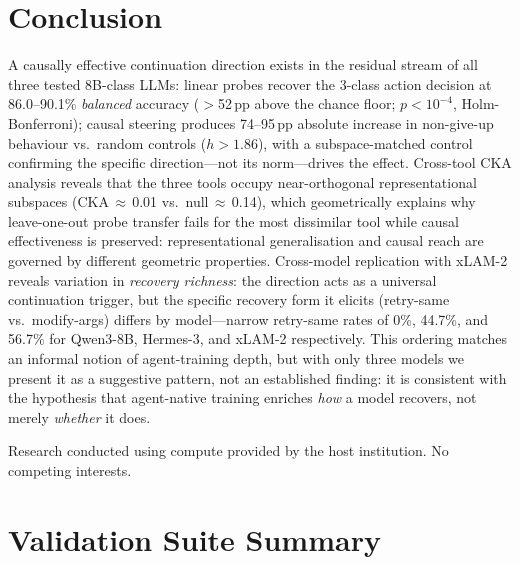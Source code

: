 \documentclass{article}
\begin{document}
\section{Conclusion}
\label{sec:conclusion}

A causally effective continuation direction exists in the residual
stream of all three tested 8B-class LLMs: linear probes recover the
3-class action decision at 86.0--90.1\% \emph{balanced} accuracy
($>$52\,pp above the chance floor; $p<10^{-4}$, Holm-Bonferroni); causal
steering produces 74--95\,pp absolute increase in non-give-up behaviour
vs.\ random controls ($h>1.86$), with a subspace-matched control
confirming the specific direction---not its norm---drives the effect.
Cross-tool CKA analysis reveals that the three tools occupy
near-orthogonal representational subspaces (CKA\,$\approx$\,0.01
vs.\ null\,$\approx$\,0.14), which geometrically explains why
leave-one-out probe transfer fails for the most dissimilar tool while
causal effectiveness is preserved: representational generalisation and
causal reach are governed by different geometric properties.
Cross-model replication with xLAM-2 reveals variation in
\emph{recovery richness}: the direction acts as a universal
continuation trigger, but the specific recovery form it elicits
(retry-same vs.\ modify-args) differs by model---narrow retry-same
rates of 0\%, 44.7\%, and 56.7\% for Qwen3-8B, Hermes-3, and xLAM-2
respectively.
This ordering matches an informal notion of agent-training depth, but
with only three models we present it as a suggestive pattern, not an
established finding: it is consistent with the hypothesis that
agent-native training enriches \emph{how} a model recovers, not merely
\emph{whether} it does.

\begin{ack}
Research conducted using compute provided by the host institution.
No competing interests.
\end{ack}




\clearpage
\appendix
\section{Validation Suite Summary}
\label{app:gates}
\end{document}
